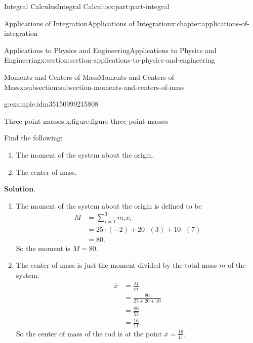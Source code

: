 \documentclass[twoside,10pt,]{book}
\newcommand{\blocktitlefont}{\relax}
\numberwithin{equation}{part}
\newcommand{\amp}{&}
\begin{document}
\begin{partptx}{Integral Calculus}{}{Integral Calculus}{}{}{x:part:part-integral}
\begin{chapterptx}{Applications of Integration}{}{Applications of Integration}{}{}{x:chapter:applications-of-integration}
\begin{sectionptx}{Applications to Physics and Engineering}{}{Applications to Physics and Engineering}{}{}{x:section:section-applications-to-physics-and-engineering}
\begin{subsectionptx}{Moments and Centers of Mass}{}{Moments and Centers of Mass}{}{}{x:subsection:subsection-moments-and-centers-of-mass}
\begin{example}{}{g:example:idm35150999215808}
\begin{figureptx}{Three point masses.}{x:figure:figure-three-point-masses}{}%
\begin{image}{0}{1}{0}%
%
\end{image}%
\tcblower
\end{figureptx}%
Find the following:%
\begin{enumerate}
\item{}The moment of the system about the origin.%
\item{}The center of mass.%
\end{enumerate}
%
\par\smallskip%
\noindent\textbf{\blocktitlefont Solution}.\hypertarget{g:solution:idm35150999212224}{}\quad{}%
\begin{enumerate}
\item{}The moment of the system about the origin is defined to be%
\begin{align*}
M \amp= \sum_{i=1}^{3}m_{i}x_{i}\\
\amp= 25\cdot(-2)+20\cdot(3)+10\cdot(7)\\
\amp= 80.
\end{align*}
So the moment is \(M = 80\).%
\item{}The center of mass is just the moment divided by the total mass \(m\) of the system:%
\begin{align*}
\overline{x}\amp= \frac{M}{m}\\
\amp= \frac{80}{25+20+10}\\
\amp= \frac{80}{55}\\
\amp= \frac{16}{11}.
\end{align*}
So the center of mass of the rod is at the point \(\overline{x} = \frac{16}{11}\).%
\end{enumerate}
\end{example}

\end{subsectionptx}
\end{sectionptx}
\end{chapterptx}
\end{partptx}
\end{document}
